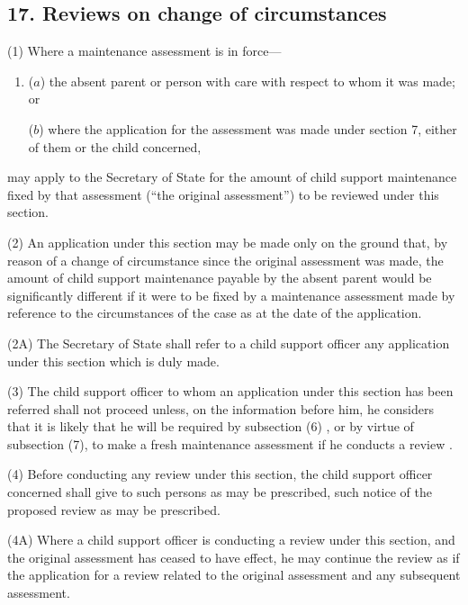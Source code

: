 \documentclass[12pt,a4paper]{article}
\begin{document}
\subsection{17. Reviews on change of circumstances}

(1) Where a maintenance assessment is in force—
\begin{enumerate}\item[]
($a$) the absent parent or person with care with respect to whom it was made; or

($b$) where the application for the assessment was made under section 7, either of them or the child concerned,
\end{enumerate}
may apply to the Secretary of State for the amount of child support maintenance fixed by that assessment (“the original assessment”) to be reviewed under this section.

(2) An application under this section may be made only on the ground that, by reason of a change of circumstance since the original assessment was made, the amount of child support maintenance payable by the absent parent would be significantly different if it were to be fixed by a maintenance assessment made by reference to the circumstances of the case as at the date of the application.

(2A) The Secretary of State shall refer to a child support officer any application under this section which is duly made.

(3) The child support officer to whom an application under this section has been referred shall not proceed unless, on the information before him, he considers that it is likely that he will be required by subsection (6)%
, or by virtue of subsection (7),  %
to make a fresh maintenance assessment if he conducts 
a review%
.

(4) Before conducting any review under this section, the child support officer concerned shall give to such persons as may be prescribed, such notice of the proposed review as may be prescribed.

(4A) Where a child support officer is conducting a review under this section, and the original assessment has ceased to have effect, he may continue the review as if the application for a review related to the original assessment and any subsequent assessment.
\end{document}

